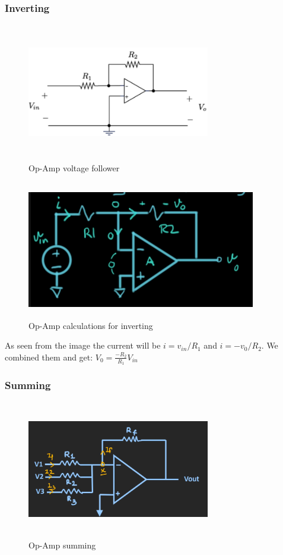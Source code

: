 \documentclass{article}
\begin{document}
\subsubsection{Inverting}
\begin{figure}[h]
    \vspace{10mm}
    \centering
    \includegraphics[width=8cm, height=6cm]{image/op-amp-inverting.png}
    \caption{Op-Amp voltage follower}
\end{figure}

\begin{figure}[h]
    \vspace{10mm}
    \centering
    \includegraphics[width=10cm, height=6cm]{image/op-amp-calc-inverting.png}
    \caption{Op-Amp calculations for inverting}
\end{figure}
As seen from the image the current will be $i=v_{in}/R_1$ and $i=-v_0/R_2$. We combined them and get:
$V_0=\frac{-R_2}{R_1}V_{in}$

\newpage
\subsubsection{Summing}
\begin{figure}[h]
    \vspace{10mm}
    \centering
    \includegraphics[width=8cm, height=6cm]{image/op-amp-summing.png}
    \caption{Op-Amp summing}
\end{figure}
\end{document}
